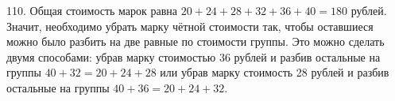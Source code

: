110. Общая стоимость марок равна $20+24+28+32+36+40=180$ рублей. Значит, необходимо убрать марку чётной стоимости так, чтобы оставшиеся можно было разбить на две равные по стоимости группы. Это можно сделать двумя способами: убрав марку стоимостью 36 рублей и разбив остальные на группы $40+32=20+24+28$ или убрав марку стоимость 28 рублей и разбив остальные на группы $40+36=20+24+32.$\\
